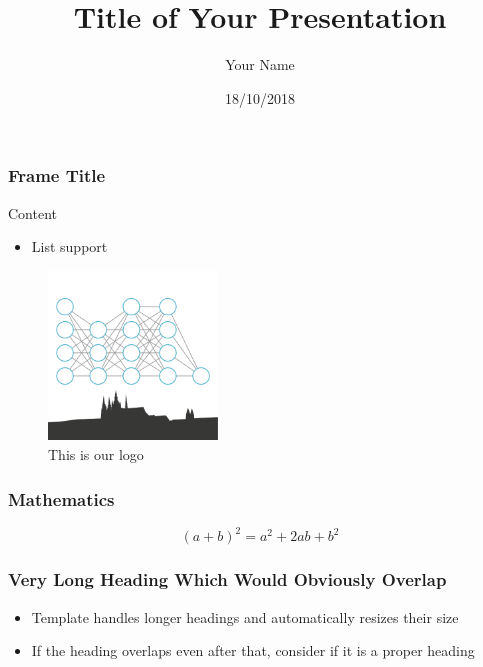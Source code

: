 \documentclass{beamer}
\title[Short Title]{Title of Your Presentation}
\author{Your Name}
\date{18/10/2018}
\begin{document}

\begin{frame}
  \frametitle{Frame Title}

  Content

  \begin{itemize}
    \item List support
  \end{itemize}

  \begin{figure}
      \includegraphics[width=0.4\textwidth]{logo}
      \caption{This is our logo}
      \label{fig:logo}
  \end{figure}

\end{frame}

\begin{frame}
  \frametitle{Mathematics}

  \[
    (a + b)^2 = a^2 + 2ab + b^2
  \]

\end{frame}

%
%
%
%

\begin{frame}
  \frametitle{Very Long Heading Which Would Obviously Overlap}

  \begin{itemize}
    \item Template handles longer headings and automatically resizes their size
    \item If the heading overlaps even after that, consider if it is a proper heading
  \end{itemize}

\end{frame}
\end{document}
